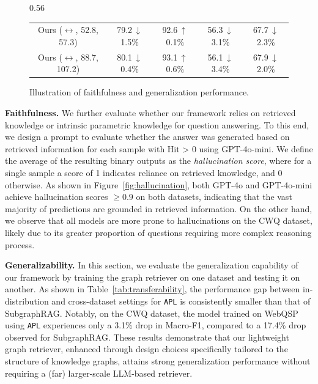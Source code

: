 \documentclass{article}
\theoremstyle{plain}
\theoremstyle{definition}
\theoremstyle{remark}
\newcommand{\tb}[1]{\textbf{#1}}
\newcommand{\proj}{\texttt{\scalebox{1.03}{R}APL}}
\begin{document}
\begin{figure}[t]
\begin{subtable}[c]{0.56\linewidth}
{\begin{tabular}{@{}ccccc@{}}
        Ours ($\leftrightarrow$, 52.8, 57.3)   & 79.2\,{\scriptsize\textcolor{downred}{$\downarrow$1.5\%}}
                                                & 92.6\,{\scriptsize\textcolor{upgreen}{$\uparrow$0.1\%}}
                                                & 56.3\,{\scriptsize\textcolor{downred}{$\downarrow$3.1\%}}
                                                & 67.7\,{\scriptsize\textcolor{downred}{$\downarrow$2.3\%}} \\
        Ours ($\leftrightarrow$, 88.7, 107.2)  & 80.1\,{\scriptsize\textcolor{downred}{$\downarrow$0.4\%}}
                                                & 93.1\,{\scriptsize\textcolor{upgreen}{$\uparrow$0.6\%}}
                                                & 56.1\,{\scriptsize\textcolor{downred}{$\downarrow$3.4\%}}
                                                & 67.9\,{\scriptsize\textcolor{downred}{$\downarrow$2.0\%}} \\
        \bottomrule
        \end{tabular}
    }
    \vspace{0.8em}
  \end{subtable}
  \caption{Illustration of faithfulness and generalization performance.}
  \vspace{-1ex}
\end{figure}

\tb{Faithfulness.} We further evaluate whether our framework relies on retrieved knowledge or intrinsic parametric knowledge for question answering. To this end, we design a prompt to evaluate whether the answer was generated based 
on retrieved information for each sample with Hit > 0 using GPT-4o-mini. We 
define the average of the resulting binary outputs as the \textit{hallucination score}, where for a single sample a score of 1 indicates reliance on retrieved knowledge, and 0 otherwise. As shown in Figure~\ref{fig:hallucination}, both GPT-4o and GPT-4o-mini achieve hallucination scores $\geq 0.9$ on both datasets, indicating that the vast majority of predictions are grounded in retrieved information. On the other hand, we observe that all models are more prone to hallucinations on the CWQ dataset, likely due to its greater proportion of questions requiring more complex reasoning process. 

\tb{Generalizability.} 
In this section, we evaluate the generalization capability of our framework by training the graph retriever on one dataset and testing it on another. As shown in Table~\ref{tab:transferability}, the performance gap between in-distribution and cross-dataset settings for \proj{} is consistently smaller than that of SubgraphRAG. Notably, on the CWQ dataset, the model trained on WebQSP using \proj{} experiences only a 3.1\% drop in Macro-F1, compared to a 17.4\% drop observed for SubgraphRAG. These results demonstrate that our lightweight graph retriever, enhanced through design choices specifically tailored to the structure of knowledge graphs, attains strong generalization performance without requiring a (far) larger-scale LLM-based retriever.
\end{document}
